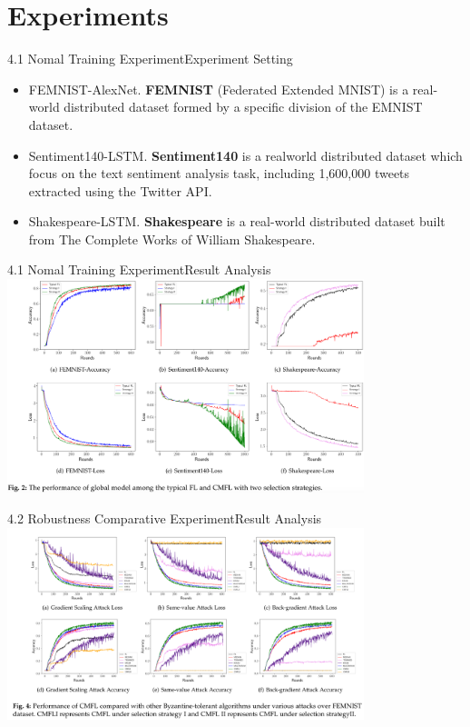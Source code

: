 \documentclass{sintefbeamer}
\theoremstyle{definition}
\begin{document}
\section{Experiments}

\begin{frame}{4.1 Nomal Training Experiment}{Experiment Setting}
	\begin{itemize}
\item[1)] FEMNIST-AlexNet. \textbf{FEMNIST} (Federated Extended MNIST) is a real-world distributed dataset formed by a specific division of the EMNIST dataset. 
\item[2)] Sentiment140-LSTM. \textbf{Sentiment140} is a realworld distributed dataset which focus on the text sentiment analysis task, including 1,600,000 tweets extracted using the Twitter API. 
\item[3)] Shakespeare-LSTM. \textbf{Shakespeare} is a real-world distributed dataset built from The Complete Works of William Shakespeare. 
\end{itemize}
\end{frame}

\begin{frame}{4.1 Nomal Training Experiment}{Result Analysis}
	\includegraphics[width=0.78\textwidth]{images/exp_fig2}
\end{frame}

%	



\begin{frame}{4.2 Robustness Comparative Experiment}{Result Analysis}
	\includegraphics[width=0.78\textwidth]{images/exp_fig4}
\end{frame}
\end{document}
